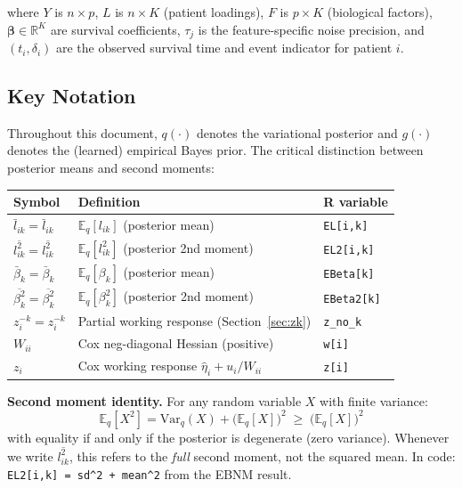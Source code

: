 \documentclass[11pt]{article}
\newcommand{\lbar}[2]{\bar{l}_{#1#2}}
\newcommand{\betabar}[1]{\bar{\beta}_{#1}}
\newcommand{\lsec}[2]{\overline{l^2_{#1#2}}}
\newcommand{\betasec}[1]{\overline{\beta^2_{#1}}}
\newcommand{\zk}[0]{z^{-k}}
\begin{document}
\noindent
where $Y$ is $n\times p$, $L$ is $n\times K$ (patient loadings),
$F$ is $p\times K$ (biological factors), $\bm{\beta}\in\mathbb{R}^K$
are survival coefficients, $\tau_j$ is the feature-specific noise precision,
and $(t_i, \delta_i)$ are the observed survival time and event indicator for
patient $i$.

\subsection{Key Notation}

Throughout this document, $q(\cdot)$ denotes the variational posterior and
$g(\cdot)$ denotes the (learned) empirical Bayes prior.  The critical
distinction between posterior means and second moments:

\begin{center}
\begin{tabular}{lll}
\toprule
\textbf{Symbol} & \textbf{Definition} & \textbf{R variable} \\
\midrule
$\lbar{i}{k} = \bar{l}_{ik}$ & $\mathbb{E}_q[l_{ik}]$ (posterior mean) & \texttt{EL[i,k]} \\
$\lsec{i}{k} = \overline{l^2_{ik}}$ & $\mathbb{E}_q[l_{ik}^2]$ (posterior 2nd moment) & \texttt{EL2[i,k]} \\
$\betabar{k} = \bar{\beta}_k$ & $\mathbb{E}_q[\beta_k]$ (posterior mean) & \texttt{EBeta[k]} \\
$\betasec{k} = \overline{\beta^2_k}$ & $\mathbb{E}_q[\beta_k^2]$ (posterior 2nd moment) & \texttt{EBeta2[k]} \\
$\zk_i = z_i^{-k}$ & Partial working response (Section~\ref{sec:zk}) & \texttt{z\_no\_k} \\
$W_{ii}$ & Cox neg-diagonal Hessian (positive) & \texttt{w[i]} \\
$z_i$ & Cox working response $\hat{\eta}_i + u_i/W_{ii}$ & \texttt{z[i]} \\
\bottomrule
\end{tabular}
\end{center}

\begin{verifybox}
\textbf{Second moment identity.}  For any random variable $X$ with
finite variance:
\[
  \mathbb{E}_q[X^2] = \mathrm{Var}_q(X) + \bigl(\mathbb{E}_q[X]\bigr)^2
  \;\geq\; \bigl(\mathbb{E}_q[X]\bigr)^2
\]
with equality if and only if the posterior is degenerate (zero variance).
Whenever we write $\overline{l^2_{ik}}$, this refers to the \emph{full}
second moment, not the squared mean.  In code: \texttt{EL2[i,k] = sd\^{}2 +
mean\^{}2} from the EBNM result.
\end{verifybox}
\end{document}
